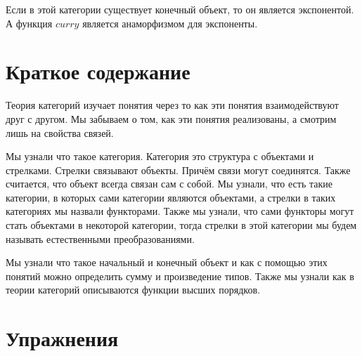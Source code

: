 Если в этой категории существует конечный объект, то он является
экспонентой. А функция $curry$ является анаморфизмом для экспоненты.

\section{Краткое содержание}

Теория категорий изучает понятия через то как эти понятия
взаимодействуют друг с другом. Мы забываем о том, как эти понятия
реализованы, а смотрим лишь на свойства связей.

Мы узнали что такое категория. Категория это структура с объектами и
стрелками. Стрелки связывают объекты. Причём связи могут соединятся.
Также считается, что объект всегда связан сам с собой. Мы узнали, что
есть такие категории, в которых сами категории являются объектами, а
стрелки в таких категориях мы назвали функторами. Также мы узнали, что
сами функторы могут стать объектами в некоторой категории, тогда стрелки
в этой категории мы будем называть естественными преобразованиями.

Мы узнали что такое начальный и конечный объект и как с помощью этих
понятий можно определить сумму и произведение типов. Также мы узнали как
в теории категорий описываются функции высших порядков.

\section{Упражнения}


